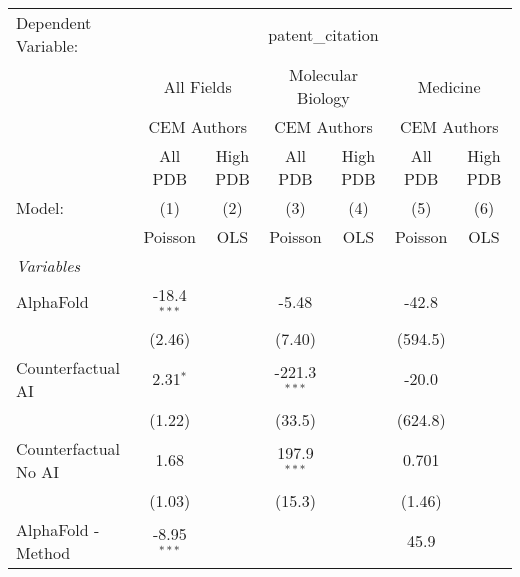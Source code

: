 \begingroup
\centering
\begin{tabular}{lcccccc}
   \tabularnewline \midrule \midrule
   Dependent Variable: & \multicolumn{6}{c}{patent\_citation}\\
 & \multicolumn{2}{c}{All Fields} & \multicolumn{2}{c}{Molecular Biology} & \multicolumn{2}{c}{Medicine} \\
\cmidrule(lr){2-3} \cmidrule(lr){4-5} \cmidrule(lr){6-7}
 & \multicolumn{2}{c}{CEM Authors} & \multicolumn{2}{c}{CEM Authors} & \multicolumn{2}{c}{CEM Authors} \\
\cmidrule(lr){2-3} \cmidrule(lr){4-5} \cmidrule(lr){6-7}
 & \multicolumn{1}{c}{All PDB} & \multicolumn{1}{c}{High PDB} & \multicolumn{1}{c}{All PDB} & \multicolumn{1}{c}{High PDB} & \multicolumn{1}{c}{All PDB} & \multicolumn{1}{c}{High PDB} \\
\cmidrule(lr){2-2} \cmidrule(lr){3-3} \cmidrule(lr){4-4} \cmidrule(lr){5-5} \cmidrule(lr){6-6} \cmidrule(lr){7-7}
   Model:                                                     & (1)           & (2)  & (3)            & (4)  & (5)          & (6)\\  
                                                              &  Poisson      & OLS  & Poisson        & OLS  & Poisson      & OLS\\  
   \midrule
   \emph{Variables}\\
   AlphaFold                                                  & -18.4$^{***}$ &      & -5.48          &      & -42.8        &   \\   
                                                              & (2.46)        &      & (7.40)         &      & (594.5)      &   \\   
   Counterfactual AI                                          & 2.31$^{*}$    &      & -221.3$^{***}$ &      & -20.0        &   \\   
                                                              & (1.22)        &      & (33.5)         &      & (624.8)      &   \\   
   Counterfactual No AI                                       & 1.68          &      & 197.9$^{***}$  &      & 0.701        &   \\   
                                                              & (1.03)        &      & (15.3)         &      & (1.46)       &   \\   
   AlphaFold - Method                                         & -8.95$^{***}$ &      &                &      & 45.9         &   \\   

\end{tabular}
